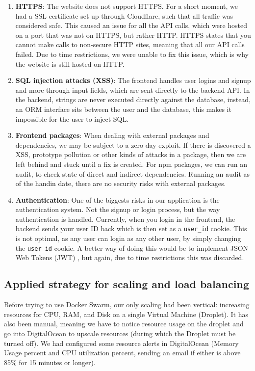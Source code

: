 \begin{enumerate}
    \item \textbf{HTTPS}: The website does not support HTTPS. For a short moment, we had a SSL certificate set up through Cloudflare, such that all traffic was considered safe. This caused an issue for all the API calls, which were hosted on a port that was not on HTTPS, but rather HTTP. HTTPS states that you cannot make calls to non-secure HTTP sites, meaning that all our API calls failed. Due to time restrictions, we were unable to fix this issue, which is why the website is still hosted on HTTP.
    \item \textbf{SQL injection attacks (XSS)}: The frontend handles user logins and signup and more through input fields, which are sent directly to the backend API. In the backend, strings are never executed directly against the database, instead, an ORM interface sits between the user and the database, this makes it impossible for the user to inject SQL. 
    \item \textbf{Frontend packages}: When dealing with external packages and dependencies, we may be subject to a zero day exploit. If there is discovered a XSS, prototype pollution or other kinds of attacks in a package, then we are left behind and stuck until a fix is created. For npm packages, we can run an audit, to check state of direct and indirect dependencies. Running an audit as of the handin date, there are no security risks with external packages.
    \item \textbf{Authentication}: One of the biggests risks in our application is the authentication system. Not the signup or login process, but the way authentication is handled. Currently, when you login in the frontend, the backend sends your user ID back which is then set as a \verb|user_id| cookie. This is not optimal, as any user can login as any other user, by simply changing the \verb|user_id| cookie. A better way of doing this would be to implement JSON Web Tokens (JWT) \cite{jwt}, but again, due to time restrictions this was discarded.
\end{enumerate}

\subsection{Applied strategy for scaling and load balancing}
Before trying to use Docker Swarm, our only scaling had been vertical: increasing resources for CPU, RAM, and Disk on a single Virtual Machine (Droplet). It has also been manual, meaning we have to notice resource usage on the droplet and go into DigitalOcean to upscale resources (during which the Droplet must be turned off). We had configured some resource alerts in DigitalOcean (Memory Usage percent and CPU utilization percent, sending an email if either is above 85\% for 15 minutes or longer). 

